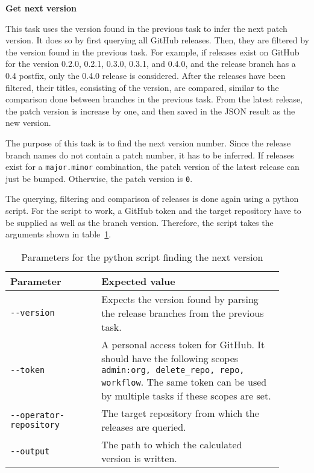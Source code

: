 \textbf{Get next version}

This task uses the version found in the previous task to infer the next patch version.
It does so by first querying all GitHub releases.
Then, they are filtered by the version found in the previous task.
For example, if releases exist on GitHub for the version 0.2.0, 0.2.1, 0.3.0, 0.3.1, and 0.4.0, and the release branch has a 0.4 postfix, only the 0.4.0 release is considered.
After the releases have been filtered, their titles, consisting of the version, are compared, similar to the comparison done between branches in the previous task.
From the latest release, the patch version is increase by one, and then saved in the JSON result as the new version.

The purpose of this task is to find the next version number.
Since the release branch names do not contain a patch number, it has to be inferred.
If releases exist for a \verb|major.minor| combination, the patch version of the latest release can just be bumped.
Otherwise, the patch version is \verb|0|.

The querying, filtering and comparison of releases is done again using a python script.
For the script to work, a GitHub token and the target repository have to be supplied as well as the branch version.
Therefore, the script takes the arguments shown in table~\ref{tab:py-finding-the-next-version}.

\begin{table}[H]
    \centering
    \caption{Parameters for the python script finding the next version}
    \label{tab:py-finding-the-next-version}
    \begin{tabular}{p{0.3\linewidth}|p{0.6\linewidth}}
        Parameter & Expected value \\
        \hline
        \verb|--version| & Expects the version found by parsing the release branches from the previous task.  \\
        \verb|--token| &  A personal access token for GitHub.
            It should have the following scopes \verb|admin:org, delete_repo, repo, workflow|.
            The same token can be used by multiple tasks if these scopes are set. \\
        \verb|--operator-repository| & The target repository from which the releases are queried. \\
        \verb|--output| & The path to which the calculated version is written. \\
    \end{tabular}
\end{table}

